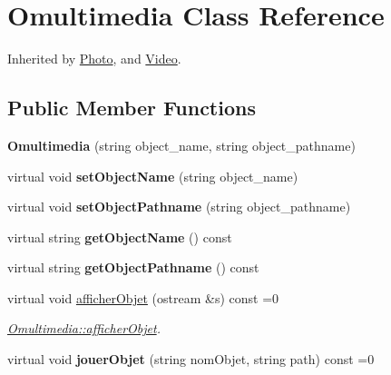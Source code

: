\hypertarget{class_omultimedia}{\section{Omultimedia Class Reference}
\label{class_omultimedia}
}


Inherited by \hyperlink{class_photo}{Photo}, and \hyperlink{class_video}{Video}.

\subsection*{Public Member Functions}
\begin{DoxyCompactItemize}
\item 
\hypertarget{class_omultimedia_a7f1e73b963ad35cf904c1ca05836c90d}{{\bfseries Omultimedia} (string object\+\_\+name, string object\+\_\+pathname)}\label{class_omultimedia_a7f1e73b963ad35cf904c1ca05836c90d}

\item 
\hypertarget{class_omultimedia_a9f9f433c1156c1febf54b88037de8ddb}{virtual void {\bfseries set\+Object\+Name} (string object\+\_\+name)}\label{class_omultimedia_a9f9f433c1156c1febf54b88037de8ddb}

\item 
\hypertarget{class_omultimedia_a4e8aebf79dbc7759e9566eaa18f00b38}{virtual void {\bfseries set\+Object\+Pathname} (string object\+\_\+pathname)}\label{class_omultimedia_a4e8aebf79dbc7759e9566eaa18f00b38}

\item 
\hypertarget{class_omultimedia_ae6404617513dd4b667fee79b72be6fb0}{virtual string {\bfseries get\+Object\+Name} () const }\label{class_omultimedia_ae6404617513dd4b667fee79b72be6fb0}

\item 
\hypertarget{class_omultimedia_a6f503402124f2c086c62ca473b3295e4}{virtual string {\bfseries get\+Object\+Pathname} () const }\label{class_omultimedia_a6f503402124f2c086c62ca473b3295e4}

\item 
virtual void \hyperlink{class_omultimedia_ae8942bb1db61d92962a71bbe7512c037}{afficher\+Objet} (ostream \&s) const =0
\begin{DoxyCompactList}\small\item\em \hyperlink{class_omultimedia_ae8942bb1db61d92962a71bbe7512c037}{Omultimedia\+::afficher\+Objet}. \end{DoxyCompactList}\item 
\hypertarget{class_omultimedia_ab3836cd1744e98bdc6752ebd0283911e}{virtual void {\bfseries jouer\+Objet} (string nom\+Objet, string path) const =0}\label{class_omultimedia_ab3836cd1744e98bdc6752ebd0283911e}

\end{DoxyCompactItemize}


